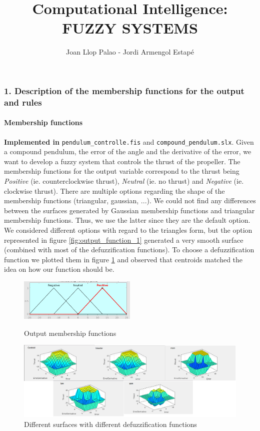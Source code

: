 \documentclass{article}[11pt]
\title{\vspace{-2.0cm}Computational Intelligence: FUZZY SYSTEMS
                        }
\author{Joan Llop Palao - Jordi Armengol Estapé}
\date{}
\begin{document}
\maketitle

\subsubsection*{1. Description of the membership functions for the output and rules}

\paragraph{Membership functions } \textbf{Implemented in} \texttt{pendulum\_controlle.fis} and \texttt{compound\_pendulum.slx}. Given a compound pendulum, the error of the angle and the derivative of the error, we want to develop a fuzzy system that controls the thrust of the propeller. The membership functions for the output variable correspond to the thrust being \textit{Positive} (ie. counterclockwise thrust), \textit{Neutral} (ie. no thrust) and \textit{Negative} (ie. clockwise thrust). There are multiple options regarding the shape of the membership functions (triangular, gaussian, ...). We could not find any differences between the surfaces generated by Gaussian membership functions and triangular membership functions. Thus, we use the latter since they are the default option. We considered different options with regard to the triangles form, but the option represented in figure \ref{fig:output_function_1} generated a very smooth surface (combined with most of the defuzzification functions). To choose a defuzzification function we plotted them in figure \ref{fig:defuzzification} and observed that centroids matched the idea on how our function should be.
\begin{figure}[htb!]
    \centering
    \includegraphics[width=0.5\textwidth]{img/output_variable_trinf_extended.png}
    \caption{Output membership functions}
    \label{fig:output_function_1}
    \centering
    \centerline{\includegraphics[width=\textwidth]{img/defuzzification.png}}
    \caption{Different surfaces with different defuzzification functions}
    \label{fig:defuzzification}
\end{figure}
\end{document}

